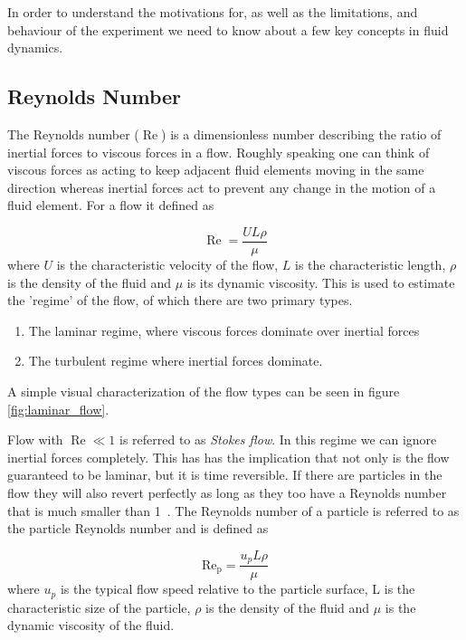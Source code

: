 In order to understand the motivations for, as well as the limitations, and behaviour of the experiment we need to know about a few key concepts in fluid dynamics.

\subsection{Reynolds Number}
The Reynolds number ($\operatorname{Re}$) is a dimensionless number describing the ratio of inertial forces to viscous forces in a flow. Roughly speaking one can think of viscous forces as acting to keep adjacent fluid elements moving in the same direction whereas inertial forces act to prevent any change in the motion of a fluid element. For a flow it defined as \cite{introfluid}

\begin{equation}\label{eq:reynolds}
\operatorname{Re} = \frac{U L \rho}{\mu}
\end{equation}
where $U$ is the characteristic velocity of the flow, $L$ is the characteristic length, $\rho$ is the density of the fluid and $\mu$ is its dynamic viscosity. This is used to estimate the 'regime' of the flow, of which there are two primary types. 
\begin{enumerate}
\item The laminar regime, where viscous forces dominate over inertial forces
\item The turbulent regime where inertial forces dominate.
\end{enumerate}

A simple visual characterization of the flow types can be seen in figure \ref{fig:laminar_flow}. 

 Flow with $\operatorname{Re}\ll 1$ is referred to as \emph{Stokes flow}. In this regime we can ignore inertial forces completely. This has has the implication that not only is the flow guaranteed to be laminar, but it is time reversible.  If there are particles in the flow they will also revert perfectly as long as they too have a Reynolds number that is much smaller than 1~\cite{introfluid3}. The Reynolds number of a particle is referred to as the particle Reynolds number and is defined as \cite{JonasLic}

\begin{equation}\label{eq:reynoldsparticle}
\operatorname{Re_p} = \frac{u_p L \rho}{\mu}
\end{equation}
where $u_p$ is the typical flow speed relative to the particle surface, L is the characteristic size of the particle, $\rho$ is the density of the fluid and $\mu$ is the dynamic viscosity of the fluid. 


